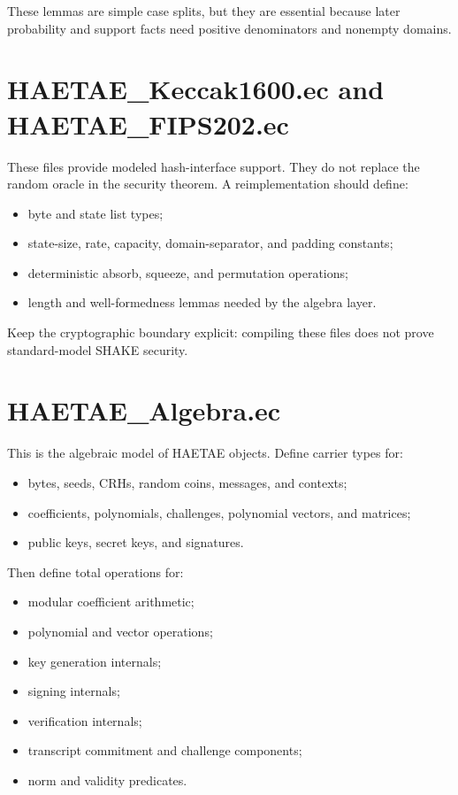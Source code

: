 \documentclass[11pt]{report}
\theoremstyle{definition}
\theoremstyle{plain}
\begin{document}
These lemmas are simple case splits, but they are essential because later
probability and support facts need positive denominators and nonempty domains.

\section{HAETAE\_Keccak1600.ec and HAETAE\_FIPS202.ec}

These files provide modeled hash-interface support.  They do not replace the
random oracle in the security theorem.  A reimplementation should define:

\begin{itemize}
\item byte and state list types;
\item state-size, rate, capacity, domain-separator, and padding constants;
\item deterministic absorb, squeeze, and permutation operations;
\item length and well-formedness lemmas needed by the algebra layer.
\end{itemize}

Keep the cryptographic boundary explicit: compiling these files does not prove
standard-model SHAKE security.

\section{HAETAE\_Algebra.ec}

This is the algebraic model of HAETAE objects.  Define carrier types for:

\begin{itemize}
\item bytes, seeds, CRHs, random coins, messages, and contexts;
\item coefficients, polynomials, challenges, polynomial vectors, and matrices;
\item public keys, secret keys, and signatures.
\end{itemize}

Then define total operations for:

\begin{itemize}
\item modular coefficient arithmetic;
\item polynomial and vector operations;
\item key generation internals;
\item signing internals;
\item verification internals;
\item transcript commitment and challenge components;
\item norm and validity predicates.
\end{itemize}
\end{document}
